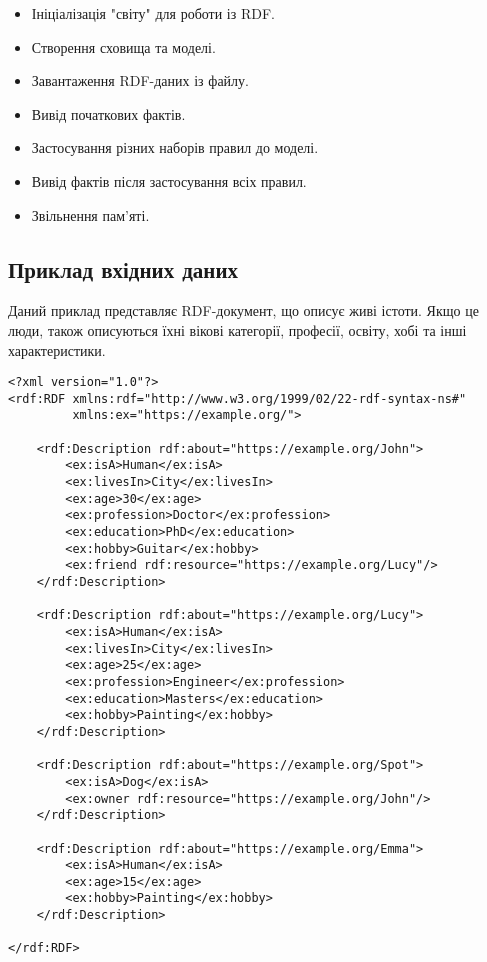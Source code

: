 \documentclass[12pt, a4paper]{article}
\begin{document}
\begin{itemize}
    \item Ініціалізація "світу" для роботи із RDF.
    \item Створення сховища та моделі.
    \item Завантаження RDF-даних із файлу.
    \item Вивід початкових фактів.
    \item Застосування різних наборів правил до моделі.
    \item Вивід фактів після застосування всіх правил.
    \item Звільнення пам'яті.
\end{itemize}

\subsection{Приклад вхідних даних}

Даний приклад представляє RDF-документ, що описує живі істоти. Якщо це люди, також описуються їхні вікові категорії, професії, освіту, хобі та інші характеристики.

\begin{verbatim}
<?xml version="1.0"?>
<rdf:RDF xmlns:rdf="http://www.w3.org/1999/02/22-rdf-syntax-ns#"
         xmlns:ex="https://example.org/">

    <rdf:Description rdf:about="https://example.org/John">
        <ex:isA>Human</ex:isA>
        <ex:livesIn>City</ex:livesIn>
        <ex:age>30</ex:age>
        <ex:profession>Doctor</ex:profession>
        <ex:education>PhD</ex:education>
        <ex:hobby>Guitar</ex:hobby>
        <ex:friend rdf:resource="https://example.org/Lucy"/>
    </rdf:Description>
    
    <rdf:Description rdf:about="https://example.org/Lucy">
        <ex:isA>Human</ex:isA>
        <ex:livesIn>City</ex:livesIn>
        <ex:age>25</ex:age>
        <ex:profession>Engineer</ex:profession>
        <ex:education>Masters</ex:education>
        <ex:hobby>Painting</ex:hobby>
    </rdf:Description>

    <rdf:Description rdf:about="https://example.org/Spot">
        <ex:isA>Dog</ex:isA>
        <ex:owner rdf:resource="https://example.org/John"/>
    </rdf:Description>

    <rdf:Description rdf:about="https://example.org/Emma">
        <ex:isA>Human</ex:isA>
        <ex:age>15</ex:age>
        <ex:hobby>Painting</ex:hobby>
    </rdf:Description>

</rdf:RDF>
\end{verbatim}
\end{document}
